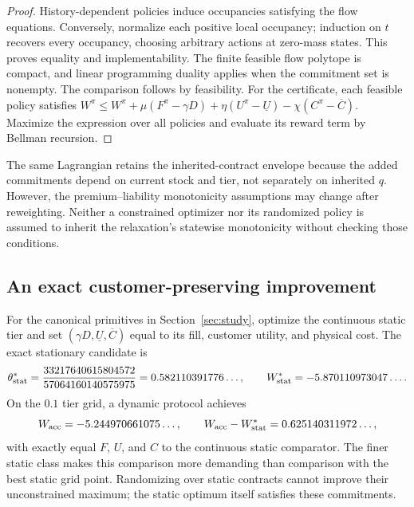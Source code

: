 \documentclass[11pt,letterpaper]{article}
\theoremstyle{definition}
\newcommand{\1}{\mathbf 1}
\begin{document}
\begin{proof}
History-dependent policies induce occupancies satisfying the flow equations. Conversely, normalize each positive local occupancy; induction on $t$ recovers every occupancy, choosing arbitrary actions at zero-mass states. This proves equality and implementability. The finite feasible flow polytope is compact, and linear programming duality applies when the commitment set is nonempty. The comparison follows by feasibility. For the certificate, each feasible policy satisfies
$W^\pi\leq W^\pi+\mu(F^\pi-\gamma D)+\eta(U^\pi-\underline U)-\chi(C^\pi-\overline C)$.
Maximize the expression over all policies and evaluate its reward term by Bellman recursion.\end{proof}
The same Lagrangian retains the inherited-contract envelope because the added commitments depend on current stock and tier, not separately on inherited $q$. However, the premium--liability monotonicity assumptions may change after reweighting. Neither a constrained optimizer nor its randomized policy is assumed to inherit the relaxation's statewise monotonicity without checking those conditions.

\subsection{An exact customer-preserving improvement}\label{sec:pareto}
For the canonical primitives in Section~\ref{sec:study}, optimize the continuous static tier and set $(\gamma D,\underline U,\overline C)$ equal to its fill, customer utility, and physical cost. The exact stationary candidate is
\[
 \theta^*_{\rm stat}=\frac{33217640615804572}{57064160140575975}
   =0.582110391776\ldots,
 \qquad W^*_{\rm stat}=-5.870110973047\ldots.
\]
On the $0.1$ tier grid, a dynamic protocol achieves
\begin{equation}\label{eq:paretogain}
 W_{\rm acc}=-5.244970661075\ldots,
 \qquad W_{\rm acc}-W^*_{\rm stat}=0.625140311972\ldots,
\end{equation}
with exactly equal $F$, $U$, and $C$ to the continuous static comparator. The finer static class makes this comparison more demanding than comparison with the best static grid point. Randomizing over static contracts cannot improve their unconstrained maximum; the static optimum itself satisfies these commitments.
\end{document}
